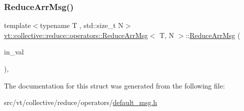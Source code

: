 \mbox{\label{structvt_1_1collective_1_1reduce_1_1operators_1_1_reduce_arr_msg_a3878c089682cd26d80245e575a2d9a54}} 
\subsubsection{\texorpdfstring{Reduce\+Arr\+Msg()}{ReduceArrMsg()}\hspace{0.1cm}{\footnotesize\ttfamily [3/3]}}
{\footnotesize\ttfamily template$<$typename T , std\+::size\+\_\+t N$>$ \\
\hyperlink{structvt_1_1collective_1_1reduce_1_1operators_1_1_reduce_arr_msg}{vt\+::collective\+::reduce\+::operators\+::\+Reduce\+Arr\+Msg}$<$ T, N $>$\+::\hyperlink{structvt_1_1collective_1_1reduce_1_1operators_1_1_reduce_arr_msg}{Reduce\+Arr\+Msg} (\begin{DoxyParamCaption}\item[{\hyperlink{structvt_1_1collective_1_1reduce_1_1operators_1_1_reduce_arr_msg_aea7790c640396dc428ddc98a1e0e7c7c}{Data\+Type} const \&}]{in\+\_\+val }\end{DoxyParamCaption})\hspace{0.3cm}{\ttfamily [inline]}, {\ttfamily [explicit]}}



The documentation for this struct was generated from the following file\+:\begin{DoxyCompactItemize}
\item 
src/vt/collective/reduce/operators/\hyperlink{default__msg_8h}{default\+\_\+msg.\+h}\end{DoxyCompactItemize}
